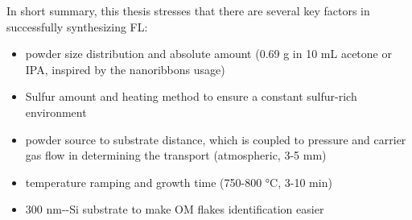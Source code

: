 In short summary, this thesis stresses that there are several key factors in successfully synthesizing  FL:
\begin{itemize}
\item {} powder size distribution and absolute amount (0.69 g  in 10 mL acetone or IPA, inspired by the  nanoribbons usage)
\item Sulfur amount and heating method to ensure a constant sulfur-rich environment
\item {} powder source to substrate distance, which is coupled to pressure and carrier gas flow in determining the transport (atmospheric, 3-5 mm)
\item temperature ramping and growth time (750-800 \si{\degreeCelsius}, 3-10 min)
\item 300 nm--Si substrate to make OM flakes identification easier
\end{itemize}

